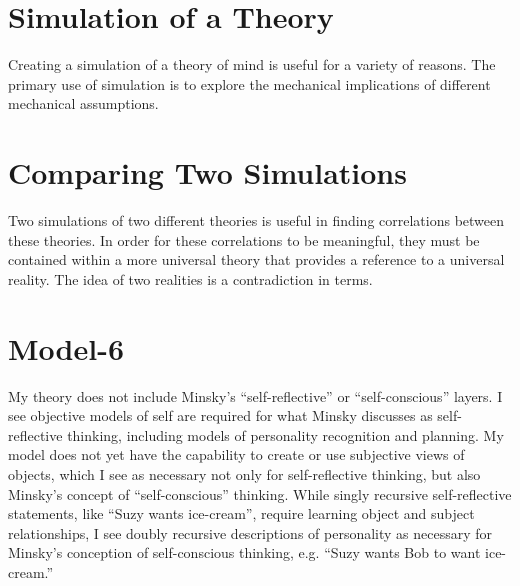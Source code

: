 \section{Simulation of a Theory}

Creating a simulation of a theory of mind is useful for a variety of
reasons.  The primary use of simulation is to explore the mechanical
implications of different mechanical assumptions.

\section{Comparing Two Simulations}

Two simulations of two different theories is useful in finding
correlations between these theories.  In order for these correlations
to be meaningful, they must be contained within a more universal
theory that provides a reference to a universal reality.  The idea of
two realities is a contradiction in terms.


\section{Model-6}

My theory does not include Minsky's ``self-reflective'' or
``self-conscious'' layers.  I see objective models of self are
required for what Minsky discusses as self-reflective thinking,
including models of personality recognition and planning.  My model
does not yet have the capability to create or use subjective views of
objects, which I see as necessary not only for self-reflective
thinking, but also Minsky's concept of ``self-conscious'' thinking.
While singly recursive self-reflective statements, like ``Suzy wants
ice-cream'', require learning object and subject relationships, I see
doubly recursive descriptions of personality as necessary for Minsky's
conception of self-conscious thinking, e.g. ``Suzy wants Bob to want
ice-cream.''

